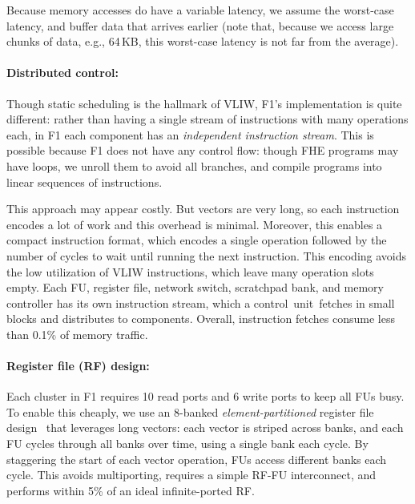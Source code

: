 Because memory accesses do have a variable latency, we assume the worst-case latency,
and buffer data that arrives earlier %
(note that, because we access large chunks of data,
e.g., 64\,KB, this worst-case latency is not far from the average).

\paragraph{Distributed control:}
Though static scheduling is the hallmark of VLIW, F1's implementation is quite different:
rather than having a single stream of instructions with many operations each, in
F1 each component has an \emph{independent instruction stream}.  %
This is possible because F1 does not have any control flow: though FHE programs may have loops,
we unroll them to avoid all branches, and compile programs into linear sequences of instructions.

This approach may appear costly. But vectors are very long, so each instruction encodes a lot of work and this overhead is minimal. Moreover, this enables a compact instruction format, which encodes a single operation followed by the number of cycles
to wait until running the next instruction. 
This encoding avoids the low utilization of VLIW instructions, which leave many operation slots empty.
Each FU, register file, network switch, scratchpad bank, and memory controller has its own instruction stream,
which a control~unit~fetches in small blocks and distributes to components.
Overall, instruction fetches consume less than 0.1\% of memory traffic.

\paragraph{Register file (RF) design:} Each cluster in F1 requires 10 read ports and 6 write ports to keep all FUs busy.
To enable this cheaply, we use an 8-banked \emph{element-partitioned} register file design~\cite{asanovic:ucb98:vector}
that leverages long vectors:
each vector is striped across banks, and each FU cycles through all banks over time, using a single bank each cycle.
By staggering the start of each vector operation, FUs access different banks each cycle.
This avoids multiporting, requires a simple RF-FU interconnect, and performs within 5\%
of an ideal infinite-ported RF.


